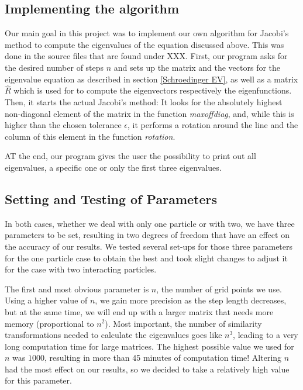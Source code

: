 \documentclass[10pt,a4paper]{article}
\begin{document}
\subsection{Implementing the algorithm}
Our main goal in this project was to implement our own algorithm for Jacobi's method to compute the eigenvalues of the equation discussed above. This was done in the source files that are found under XXX. First, our program asks for the desired number of steps $n$ and sets up the matrix and the vectors for the eigenvalue equation as described in section \ref{Schroedinger EV}, as well as a matrix $\hat{R}$ which is used for to compute the eigenvectors respectively the eigenfunctions. Then, it starts the actual Jacobi's method: It looks for the absolutely highest non-diagonal element of the matrix in the function \emph{maxoffdiag}, and, while this is higher than the chosen tolerance $\epsilon$, it performs a rotation around the line and the column of this element in the function \emph{rotation}.

AT the end, our program gives the user the possibility to print out all eigenvalues, a specific one or only the first three eigenvalues.
\subsection{Setting and Testing of Parameters}

In both cases, whether we deal with only one particle or with two, we have three parameters to be set, resulting in two degrees of freedom that have an effect on the accuracy of our results. We tested several set-ups for those three parameters for the one particle case to obtain the best and took slight changes to adjust it for the case with two interacting particles.

The first and most obvious parameter is $n$, the number of grid points we use. Using a higher value of $n$, we gain more precision as the step length decreases, but at the same time, we will end up with a larger matrix that needs more memory (proportional to $n^2$). Most important, the number of similarity transformations needed to calculate the eigenvalues goes like $n^3$, leading to a very long computation time for large matrices. The highest possible value we used for $n$ was $1000$, resulting in more than 45 minutes of computation time! Altering $n$ had the most effect on our results, so we decided to take a relatively high value for this parameter.
\end{document}
